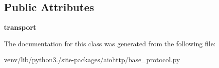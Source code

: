 \subsection*{Public Attributes}
\begin{DoxyCompactItemize}
\item 
\mbox{\label{classaiohttp_1_1base__protocol_1_1_base_protocol_a1b504f307acdb4d16c50ffa750b1dec0}} 
{\bfseries transport}
\end{DoxyCompactItemize}


The documentation for this class was generated from the following file\+:\begin{DoxyCompactItemize}
\item 
venv/lib/python3./site-\/packages/aiohttp/base\+\_\+protocol.\+py\end{DoxyCompactItemize}
